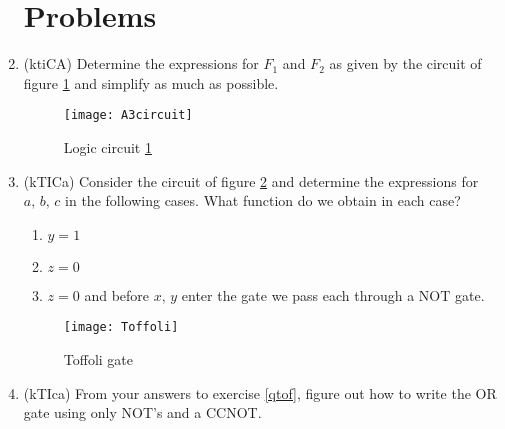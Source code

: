 \documentclass{article}
\begin{document}
\begin{enumerate}
\section{Problems}
\item (ktiCA) Determine the expressions for $F_1$ and $F_2$ as given by the circuit of figure \ref{circuit} and simplify as much as possible.
	\begin{figure}[h]
	\begin{center}
		\texttt{[image: A3circuit]}
		\caption{Logic circuit \ref{circuit}}
		\label{circuit}
	\end{center}
	\end{figure}
\item\label{qtof} (kTICa) Consider the circuit of figure \ref{toffoli} and determine the expressions for $a,\,b,\,c$ in the following cases. What function do we obtain in each case?
	\begin{enumerate}
		\item $y=1$
		\item $z=0$
		\item $z=0$ and before $x,\,y$ enter the gate we pass each through a NOT gate.
	\end{enumerate}
	\begin{figure}[h]
	\begin{center}
		\texttt{[image: Toffoli]}
		\caption{Toffoli gate}
		\label{toffoli}
	\end{center}
	\end{figure}
\item (kTIca) From your answers to exercise \ref{qtof}, figure out how to write the OR gate using only NOT's and a CCNOT.
\end{enumerate}
\end{document}
